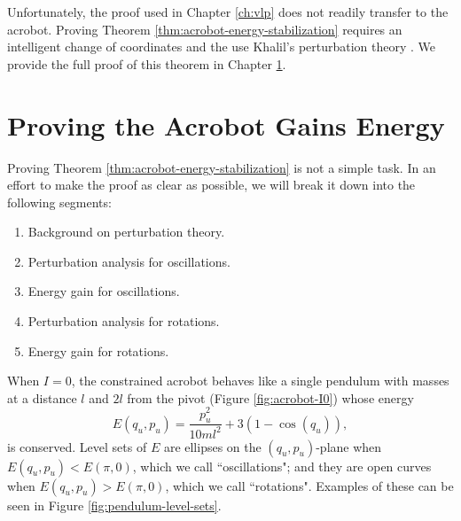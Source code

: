 Unfortunately, the proof used in Chapter \ref{ch:vlp} does not
readily transfer to the acrobot.
Proving Theorem \ref{thm:acrobot-energy-stabilization} requires an intelligent
change of coordinates and the use Khalil's perturbation
theory \cite{khalil_nonlinear}.
We provide the full proof of this theorem in Chapter \ref{sec:acrobot-proof}.
%
 
\section{Proving the Acrobot Gains Energy}\label{sec:acrobot-proof}
Proving Theorem \ref{thm:acrobot-energy-stabilization} is not a simple task.
In an effort to make the proof as clear as possible, we will break it down into
the following segments:
\begin{enumerate}
    \item Background on perturbation theory.
    \item Perturbation analysis for oscillations.
    \item Energy gain for oscillations.
    \item Perturbation analysis for rotations.
    \item Energy gain for rotations.
\end{enumerate}

When \(I = 0\), the constrained acrobot behaves like a single
pendulum with masses at a distance \(l\) and \(2l\) from the pivot 
(Figure \ref{fig:acrobot-I0}) whose energy
\begin{equation}\label{eqn:acrobot-nominal-E}
    E(q_u,p_u) = \frac{p_u^2}{10ml^2} + 3(1 - \cos(q_u))
    ,
\end{equation}
is conserved.
Level sets of \(E\) are ellipses on the \((q_u,p_u)\)-plane
when \(E(q_u,p_u) < E(\pi,0)\), which we call ``oscillations";
and they are open curves when \(E(q_u,p_u) > E(\pi,0)\), which we call
``rotations". 
Examples of these can be seen in Figure \ref{fig:pendulum-level-sets}.

